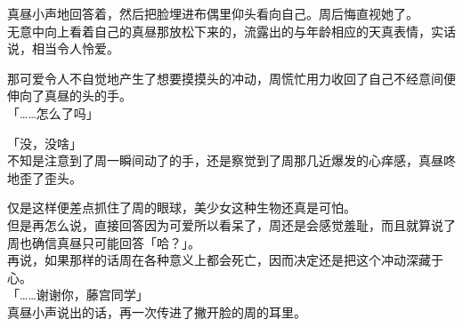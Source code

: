 真昼小声地回答着，然后把脸埋进布偶里仰头看向自己。周后悔直视她了。\\

无意中向上看着自己的真昼那放松下来的，流露出的与年龄相应的天真表情，实话说，相当令人怜爱。

那可爱令人不自觉地产生了想要摸摸头的冲动，周慌忙用力收回了自己不经意间便伸向了真昼的头的手。\\

「……怎么了吗」

「没，没啥」\\

不知是注意到了周一瞬间动了的手，还是察觉到了周那几近爆发的心痒感，真昼咚地歪了歪头。

仅是这样便差点抓住了周的眼球，美少女这种生物还真是可怕。\\

但是再怎么说，直接回答因为可爱所以看呆了，周还是会感觉羞耻，而且就算说了周也确信真昼只可能回答「哈？」。\\

再说，如果那样的话周在各种意义上都会死亡，因而决定还是把这个冲动深藏于心。\\

「……谢谢你，藤宫同学」\\

真昼小声说出的话，再一次传进了撇开脸的周的耳里。

